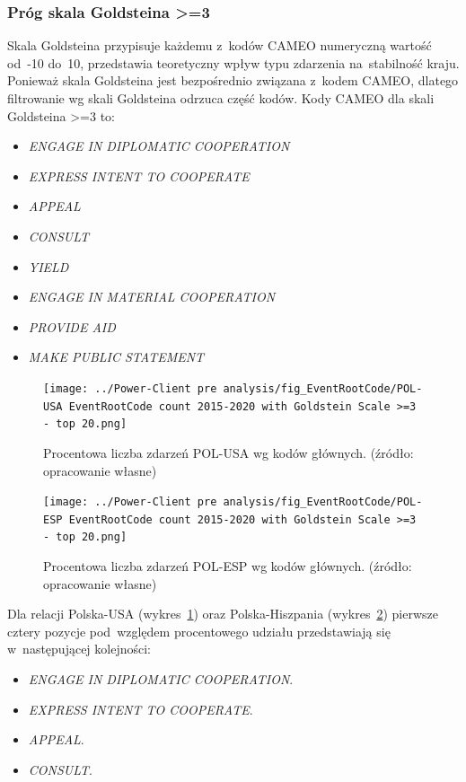\documentclass[11pt]{report}
\begin{document}
    \subsubsection{Próg skala Goldsteina >=3}
    Skala Goldsteina przypisuje każdemu z~kodów CAMEO numeryczną wartość od~-10 do~10, przedstawia teoretyczny wpływ typu zdarzenia na~stabilność kraju.
    Ponieważ skala Goldsteina jest bezpośrednio związana z~kodem CAMEO, dlatego filtrowanie wg skali Goldsteina odrzuca część kodów.
    Kody CAMEO dla skali Goldsteina >=3 to:
    \begin{itemize}
        \item \textit{ENGAGE IN DIPLOMATIC COOPERATION}
        \item \textit{EXPRESS INTENT TO COOPERATE}
        \item \textit{APPEAL}
        \item \textit{CONSULT}
        \item \textit{YIELD}
        \item \textit{ENGAGE IN MATERIAL COOPERATION}
        \item \textit{PROVIDE AID}
        \item \textit{MAKE PUBLIC STATEMENT}
    \end{itemize}

    \begin{figure}[tp]
        \centering
        \texttt{[image: ../Power-Client pre analysis/fig\_EventRootCode/POL-USA EventRootCode count 2015-2020 with Goldstein Scale >=3 - top 20.png]}
        \caption{Procentowa liczba zdarzeń POL-USA wg kodów głównych. (źródło: opracowanie własne)}
        \label{fig:Power-Client:ERC:Goldstein:POL-USA}
    \end{figure}


    \begin{figure}[tp]
        \centering
        \texttt{[image: ../Power-Client pre analysis/fig\_EventRootCode/POL-ESP EventRootCode count 2015-2020 with Goldstein Scale >=3 - top 20.png]}
        \caption{Procentowa liczba zdarzeń POL-ESP wg kodów głównych. (źródło: opracowanie własne)}
        \label{fig:Power-Client:ERC:Goldstein:POL-ESP}
    \end{figure}

    Dla relacji Polska-USA (wykres~\ref{fig:Power-Client:ERC:Goldstein:POL-USA}) oraz Polska-Hiszpania (wykres~\ref{fig:Power-Client:ERC:Goldstein:POL-ESP})
    pierwsze cztery pozycje pod~względem procentowego udziału przedstawiają się w~następującej kolejności:
    \begin{itemize}
        \item \textit{ENGAGE IN DIPLOMATIC COOPERATION}.
        \item \textit{EXPRESS INTENT TO COOPERATE}.
        \item \textit{APPEAL}.
        \item \textit{CONSULT}.
    \end{itemize}
\end{document}
